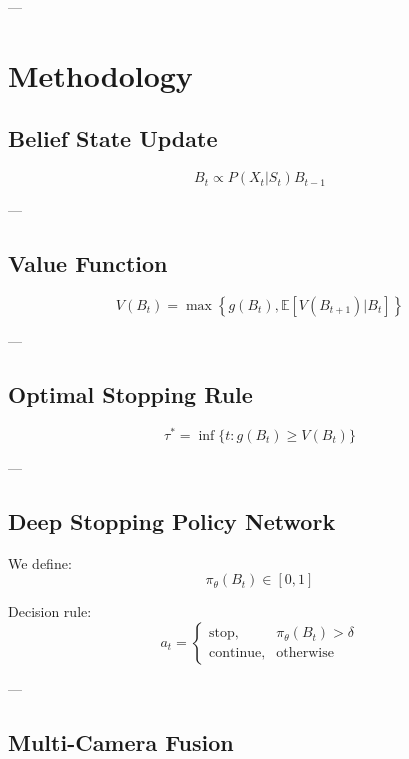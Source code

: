 \documentclass[journal]{IEEEtran}
\begin{document}
---

\section{Methodology}

\subsection{Belief State Update}

\begin{equation}
B_t \propto P(X_t | S_t) B_{t-1}
\end{equation}

---

\subsection{Value Function}

\begin{equation}
V(B_t) = \max \left\{ g(B_t), \mathbb{E}[V(B_{t+1}) | B_t] \right\}
\end{equation}

---

\subsection{Optimal Stopping Rule}

\begin{equation}
\tau^* = \inf \{ t : g(B_t) \ge V(B_t) \}
\end{equation}

---

\subsection{Deep Stopping Policy Network}

We define:
\begin{equation}
\pi_\theta(B_t) \in [0,1]
\end{equation}

Decision rule:
\begin{equation}
a_t =
\begin{cases}
\text{stop}, & \pi_\theta(B_t) > \delta \\
\text{continue}, & \text{otherwise}
\end{cases}
\end{equation}

---

\subsection{Multi-Camera Fusion}
\end{document}
